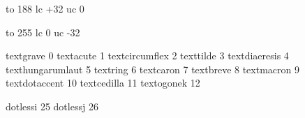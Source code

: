 

\startmapping[ec]




 to 188 lc +32 uc 0


 to 255 lc 0 uc -32


\stopmapping

\startencoding[ec][ec] %

 textgrave         0
 textacute         1
 textcircumflex    2
 texttilde         3
 textdiaeresis     4
 texthungarumlaut  5
 textring          6
 textcaron         7
 textbreve         8
 textmacron        9
 textdotaccent    10
 textcedilla      11 
 textogonek       12 

 dotlessi         25
 dotlessj         26

